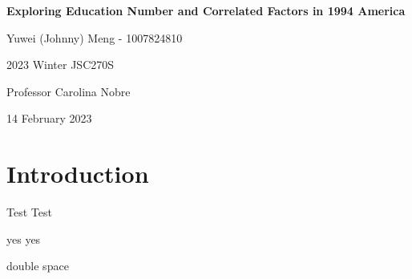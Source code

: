 \documentclass[12pt]{report}
\begin{document}
\begin{titlepage}
    \centering
    \vspace*{5cm}
    {\Large \textbf{Exploring Education Number and Correlated Factors in 1994 America}}

    \vspace{3cm}

    {\large Yuwei (Johnny) Meng - 1007824810}

    {\large 2023 Winter JSC270S}

    {\large Professor Carolina Nobre}

    {\large 14 February 2023}
\end{titlepage}

\chapter*{\large Introduction}
\vspace{-1cm}

Test Test

yes yes

double space
\end{document}
